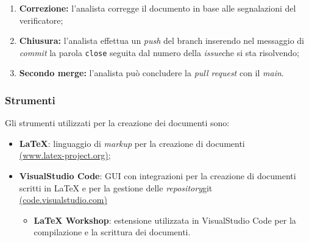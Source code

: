 \begin{itemize}
\begin{enumerate}
		      \item \textbf{Correzione:} l'analista corregge il documento
		            in base alle segnalazioni del verificatore;

		      \item \textbf{Chiusura:} l'analista effettua un \textit{push} del
		            branch inserendo nel messaggio di \textit{commit} la parola
		            \texttt{close} seguita dal numero della \textit{issue}\g che si sta
		            risolvendo;

		      \item \textbf{Secondo merge:} l'analista può concludere la
		            \textit{pull request} con il \textit{main}.
	      \end{enumerate}
\end{itemize}

\subsubsection{Strumenti}
Gli strumenti utilizzati per la creazione dei documenti sono:
\begin{itemize}
	\item \textbf{LaTeX}: linguaggio di \textit{markup} per la creazione di documenti \\
	      \href{https://www.latex-project.org/}{(www.latex-project.org)};
	\item \textbf{VisualStudio Code}: GUI con integrazioni per la creazione di documenti scritti in LaTeX e per la gestione delle \textit{repository}\g git\g \\
	      \href{https://code.visualstudio.com/}{(code.visualstudio.com)}
	      \begin{itemize}
		      \item \textbf{LaTeX Workshop}: estensione utilizzata in VisualStudio Code per la compilazione e la scrittura dei documenti.
	      \end{itemize}
\end{itemize}

